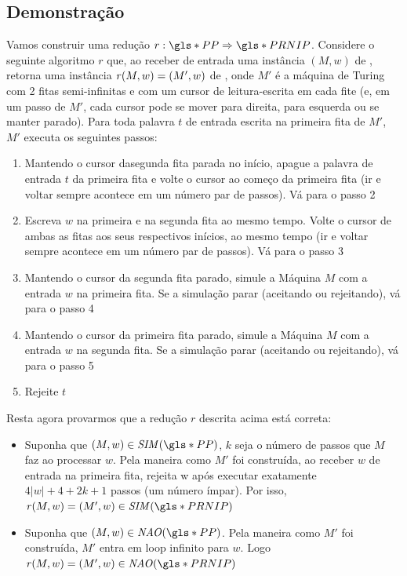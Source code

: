 \documentclass[../main.tex]{subfiles}
\begin{document}
\subsection{Demonstração}

Vamos construir uma redução $r : \PP\Rightarrow\PRNIP$. Considere o seguinte algoritmo $r$ que, ao receber de entrada uma instância $(M, w)$ de \PP, retorna uma instância $\mathit{r}(M, w) = (M', w)$ de \PRNIP, onde $M'$ é a máquina de Turing com 2 fitas semi-infinitas e com um cursor de leitura-escrita em cada fite (e, em um passo de $M'$, cada cursor pode se mover para direita, para esquerda ou se manter parado). Para toda palavra $t$ de entrada escrita na primeira fita de $M'$, $M'$ executa os seguintes passos:

\begin{enumerate}
    \item Mantendo o cursor dasegunda fita parada no início, apague a palavra de entrada $t$ da primeira fita e volte o cursor ao começo da primeira fita (ir e voltar sempre acontece em um número par de passos). Vá para o passo 2
    \item Escreva $w$ na primeira e na segunda fita ao mesmo tempo. Volte o cursor de ambas as fitas aos seus respectivos inícios, ao mesmo tempo (ir e voltar sempre acontece em um número par de passos). Vá para o passo 3
    \item Mantendo o cursor da segunda fita parado, simule a Máquina $M$ com a entrada $w$ na primeira fita. Se a simulação parar (aceitando ou rejeitando), vá para o passo 4
    \item Mantendo o cursor da primeira fita parado, simule a Máquina $M$ com a entrada $w$ na segunda fita. Se a simulação parar (aceitando ou rejeitando), vá para o passo 5
    \item Rejeite $t$
\end{enumerate}

Resta agora provarmos que a redução $r$ descrita acima está correta:

\begin{itemize}
    \item Suponha que $(M,w) \in \SIM{\PP}$, $k$ seja o número de passos que $M$ faz ao processar $w$. Pela maneira como $M'$ foi construída, ao receber $w$ de entrada na primeira fita, rejeita w após executar exatamente $4|w|+4+2k+1$ passos (um número ímpar). Por isso, $\func{r}{M,w} = (M',w)\in\SIM{\PRNIP}$
    \item Suponha que $(M,w) \in \NAO{\PP}$. Pela maneira como $M'$ foi construída, $M'$ entra em loop infinito para $w$. Logo $\func{r}{M,w}=(M',w)\in\NAO{\PRNIP}$
\end{itemize}
\end{document}

